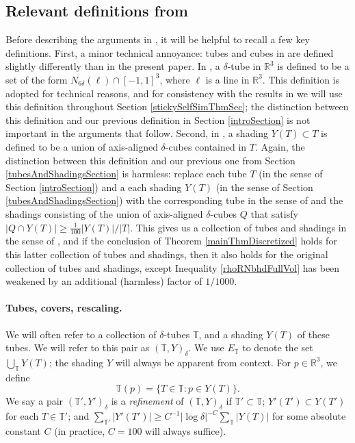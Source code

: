 \documentclass[letterpaper, reqno,11pt]{article}
\numberwithin{equation}{section}
\newcommand{\RR}{\mathbb{R}}
\newcommand{\tubes}{\mathbb{T}}
\numberwithin{thm}{section}
\theoremstyle{remark}
\begin{document}
\subsection{Relevant definitions from \cite{WZ}}
Before describing the arguments in \cite{WZ}, it will be helpful to recall a few key definitions. First, a minor technical annoyance: tubes and cubes in \cite{WZ} are defined slightly differently than in the present paper. In \cite{WZ}, a $\delta$-tube in $\RR^3$ is defined to be a set of the form $N_{6\delta}(\ell)\cap [-1,1]^3$, where $\ell$ is a line in $\RR^3$. This definition is adopted for technical reasons, and for consistency with the results in \cite{WZ} we will use this definition throughout Section \ref{stickySelfSimThmSec}; the distinction between this definition and our previous definition in Section \ref{introSection} is not important in the arguments that follow. Second, in \cite{WZ}, a shading $Y(T)\subset T$ is defined to be a union of axis-aligned $\delta$-cubes contained in $T$. Again, the distinction between this definition and our previous one from Section \ref{tubesAndShadingsSection} is harmless: replace each tube $T$ (in the sense of Section \ref{introSection}) and a each shading $Y(T)$ (in the sense of Section \ref{tubesAndShadingsSection}) with the corresponding tube in the sense of \cite{WZ} and the shadings consisting of the union of axis-aligned $\delta$-cubes $Q$ that satisfy $|Q\cap Y(T)|\geq\frac{1}{100}|Y(T)|/|T|$. This gives us a collection of tubes and shadings in the sense of \cite{WZ}, and if the conclusion of Theorem \ref{mainThmDiscretized} holds for this latter collection of tubes and shadings, then it also holds for the original collection of tubes and shadings, except Inequality \eqref{rhoRNbhdFullVol} has been weakened by an additional (harmless) factor of $1/1000$.

\paragraph{Tubes, covers, rescaling.}
We will often refer to a collection of $\delta$-tubes $\tubes$, and a shading $Y(T)$ of these tubes. We will refer to this pair as $(\tubes,Y)_\delta$. We use $E_{\tubes}$ to denote the set $\bigcup_{\tubes}Y(T)$; the shading $Y$ will always be apparent from context. For $p\in\RR^3$, we define
\begin{equation}\label{eq: TpDefn} 
\tubes(p)=\{T\in\tubes\colon p\in Y(T)\}.
\end{equation}
We say a pair $(\tubes',Y')_\delta$ is a \emph{refinement} of $(\tubes,Y)_\delta$ if $\tubes'\subset\tubes$; $Y'(T')\subset Y(T')$ for each $T\in\tubes'$; and $\sum_{\tubes'}|Y'(T')|\geq C^{-1}|\log\delta|^{-C}\sum_{\tubes}|Y(T)|$ for some absolute constant $C$ (in practice, $C=100$ will always suffice).
\end{document}
